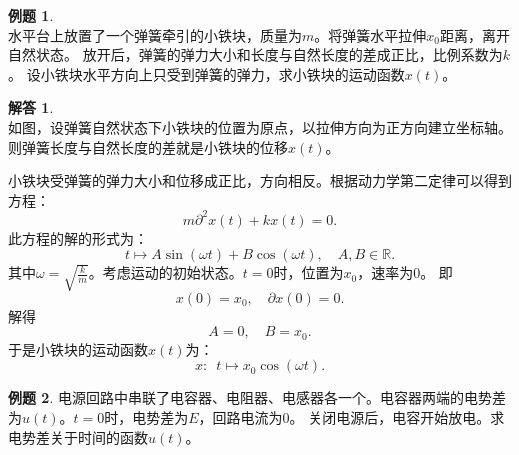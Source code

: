\documentclass[12pt,UTF8]{ctexbook}
\theoremstyle{definition}
\newtheorem{et}{例题}[section]
\newtheorem*{so}{解答}
\theoremstyle{plain}
\begin{document}
\begin{et}
    \mbox{} \\水平台上放置了一个弹簧牵引的小铁块，质量为$m$。将弹簧水平拉伸$x_0$距离，离开自然状态。
    放开后，弹簧的弹力大小和长度与自然长度的差成正比，比例系数为$k$。
    设小铁块水平方向上只受到弹簧的弹力，求小铁块的运动函数$x(t)$。%
\end{et}

\begin{so}
    \mbox{} \\
    如图，设弹簧自然状态下小铁块的位置为原点，以拉伸方向为正方向建立坐标轴。
    则弹簧长度与自然长度的差就是小铁块的位移$x(t)$。

    小铁块受弹簧的弹力大小和位移成正比，方向相反。根据动力学第二定律可以得到方程：
    $$ m\partial^2 x(t) + kx(t) = 0. $$
    此方程的解的形式为：
    $$t \mapsto A\sin{(\omega t)} + B\cos{(\omega t)}, \quad  A, B \in \mathbb{R}.$$
    其中$\omega = \sqrt{\frac{k}{m}}$。考虑运动的初始状态。$t=0$时，位置为$x_0$，速率为$0$。
    即
    $$ x(0) = x_0,\quad \partial x(0) = 0.$$
    解得
    $$ A = 0, \quad B = x_0. $$
    于是小铁块的运动函数$x(t)$为：
    $$x:\,\,\, t \mapsto x_0\cos{(\omega t)}.$$
\end{so}

\begin{et}
    电源回路中串联了电容器、电阻器、电感器各一个。电容器两端的电势差为$u(t)$。$t=0$时，电势差为$E$，回路电流为$0$。
    关闭电源后，电容开始放电。求电势差关于时间的函数$u(t)$。
\end{et}
\end{document}

